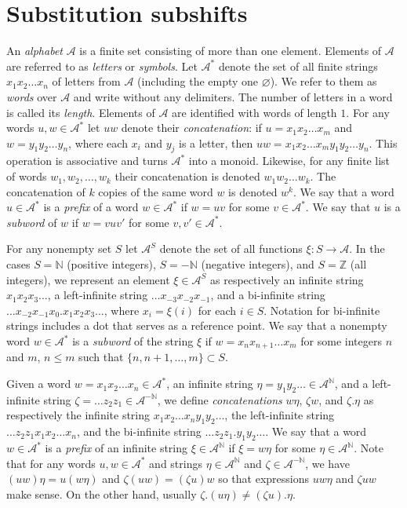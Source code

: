 \documentclass[12pt]{article}
\theoremstyle{definition}
\def\bN{\mathbb{N}}
\def\bZ{\mathbb{Z}}
\def\cA{\mathcal{A}}
\begin{document}
%
\section{Substitution subshifts}\label{sect-sub}

An \emph{alphabet} $\cA$ is a finite set consisting of more than one 
element.  Elements of $\cA$ are referred to as \emph{letters} or 
\emph{symbols}.  Let $\cA^*$ denote the set of all finite strings 
$x_1x_2\ldots x_n$ of letters from $\cA$ (including the empty one 
$\varnothing$).  We refer to them as \emph{words} over $\cA$ and write 
without any delimiters.  The number of letters in a word is called its 
\emph{length}.  Elements of $\cA$ are identified with words of length $1$.  
For any words $u,w\in\cA^*$ let $uw$ denote their \emph{concatenation}: if 
$u=x_1x_2\ldots x_m$ and $w=y_1y_2\ldots y_n$, where each $x_i$ and $y_j$ 
is a letter, then $uw=x_1x_2\ldots x_my_1y_2\ldots y_n$.  This operation is 
associative and turns $\cA^*$ into a monoid.  Likewise, for any finite list 
of words $w_1,w_2,\dots,w_k$ their concatenation is denoted $w_1w_2\ldots 
w_k$.  The concatenation of $k$ copies of the same word $w$ is denoted 
$w^k$.  We say that a word $u\in\cA^*$ is a \emph{prefix} of a word 
$w\in\cA^*$ if $w=uv$ for some $v\in\cA^*$.  We say that $u$ is a 
\emph{subword} of $w$ if $w=vuv'$ for some $v,v'\in\cA^*$.

For any nonempty set $S$ let $\cA^S$ denote the set of all functions 
$\xi:S\to\cA$.  In the cases $S=\bN$ (positive integers), $S=-\bN$ 
(negative integers), and $S=\bZ$ (all integers), we represent an element 
$\xi\in\cA^S$ as respectively an infinite string $x_1x_2x_3\ldots$, a 
left-infinite string $\ldots x_{-3}x_{-2}x_{-1}$, and a bi-infinite string 
$\ldots x_{-2}x_{-1}x_0.x_1x_2x_3\ldots$, where $x_i=\xi(i)$ for each $i\in 
S$.  Notation for bi-infinite strings includes a dot that serves as a 
reference point.  We say that a nonempty word $w\in\cA^*$ is a 
\emph{subword} of the string $\xi$ if $w=x_nx_{n+1}\ldots x_m$ for some 
integers $n$ and $m$, $n\le m$ such that $\{n,n+1,\dots,m\}\subset S$.

Given a word $w=x_1x_2\ldots x_n\in\cA^*$, an infinite string 
$\eta=y_1y_2\ldots\in\cA^{\bN}$, and a left-infinite string $\zeta=\ldots 
z_2z_1\in\cA^{-\bN}$, we define \emph{concatenations} $w\eta$, $\zeta w$, 
and $\zeta.\eta$ as respectively the infinite string $x_1x_2\ldots x_n 
y_1y_2\ldots$, the left-infinite string $\ldots z_2z_1x_1x_2\ldots x_n$, 
and the bi-infinite string $\ldots z_2z_1.y_1y_2\ldots$.  We say that a 
word $w\in\cA^*$ is a \emph{prefix} of an infinite string $\xi\in\cA^{\bN}$ 
if $\xi=w\eta$ for some $\eta\in\cA^{\bN}$.  Note that for any words 
$u,w\in\cA^*$ and strings $\eta\in\cA^{\bN}$ and $\zeta\in\cA^{-\bN}$, we 
have $(uw)\eta=u(w\eta)$ and $\zeta(uw)=(\zeta u)w$ so that expressions 
$uw\eta$ and $\zeta uw$ make sense.  On the other hand, usually 
$\zeta.(u\eta)\ne(\zeta u).\eta$.
\end{document}
